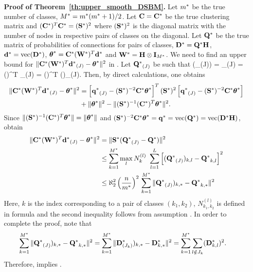 \noindent
{\bf Proof of Theorem~\ref{th:upper_smooth_DSBM}. }
Let  ${m^*}$ be the true number of classes,  ${M^*} = {m^*}({m^*} +1)/2$.
Let $\mathbf{C} = {\mathbf{C}^*}$ be the true clustering matrix and $({\mathbf{C}^*})^T {\mathbf{C}^*} = ({\mathbf{S}^*})^2$ where $({\mathbf{S}^*})^2$ is the diagonal 
matrix with the number of nodes in respective pairs of classes on the diagonal. 
Let ${\mathbf{Q}^*}$ be the true matrix of probabilities of connections for pairs of classes, $\mathbf{D}^* = {\mathbf{Q}^*} \mathbf{H}$, ${\mathbf{d}^*} = \mbox{vec}(\mathbf{D}^*)$,
$\btes = \bCs (\bWs)^T \bds$ and ${\mathbf{W}^*} = \mathbf{H} \otimes \mathbf{I}_{{M^*}}$. 
We need to find an upper bound for  $\| \bCs  (\bWs)^T \bds_{(J)} - \btes \|^2$ in . 
Let ${\mathbf{Q}^*}_{(J)}$ be such that 
\bes
 \vect(\bQs_{(J)}) =  \bqs_{(J)} = (\bWs)^T \bds_{(J)} =  (\bWs)^T (\bWs \bqs)_{(J)}. %
\ees
Then, by direct calculations, one obtains  
\begin{align*}
\| \bCs  (\bWs)^T \bds_{(J)} - \btes \|^2 & = \lkv \bqs_{(J)}  - (\bSs)^{-2} \bCs \btes\rkv^T  (\bSs)^2  \lkv \bqs_{(J)} - (\bSs)^{-2} \bCs \btes\rkv \\
& +  \|\btes\|^2 - \|(\bSs)^{-1} (\bCs)^T \btes \|^2.
\end{align*}
Since  $\|(\bSs)^{-1} (\bCs)^T \btes\| = \|\btes\|$ and $(\bSs)^{-2} \bCs \btes = \bqs = \vect(\bQs) = \vect(\bDs \bH)$,
obtain 
\begin{align*}
\| \bCs  (\bWs)^T \bds_{(J)} - \btes \|^2 & =  \|\bSs (\bQs_{(J)} - \bQs)\|^2 \\
& \leq  \sum_{k=1}^{\Ms} \max_{l}  N_{k}^{(l)}\ \sum_{l=1}^L \lkv (\bQs_{(J)})_{k,l} - \bQs_{k,l} \rkv^2\\
& \leq \aleph_2^2 \lkr \frac{n}{\ms} \rkr^2 \, \sum_{k=1}^{\Ms} \|\bQs_{(J)})_{k,*} - \bQs_{k,*}\|^2 
\end{align*}
Here, $k$ is the index corresponding to a pair of classes $(k_1, k_2)$,   $N_{k_1, k_2}^{(l)}$ is 
defined in formula  and the second inequality follows from assumption .
In order to complete the proof, note that 
\begin{align*}  
\sum_{k=1}^{\Ms} \|\bQs_{(J)})_{k,*} - \bQs_{k,*}\|^2 & = \sum_{k=1}^{\Ms}   \|\bDs_{(J_k)})_{k,*} - \bDs_{k,*}\|^2 
= \sum_{k=1}^{\Ms}   \sum_{l \notin J_k} (\bDs_{k,l})^2.   
\end{align*} 
Therefore,  implies . 
\\




